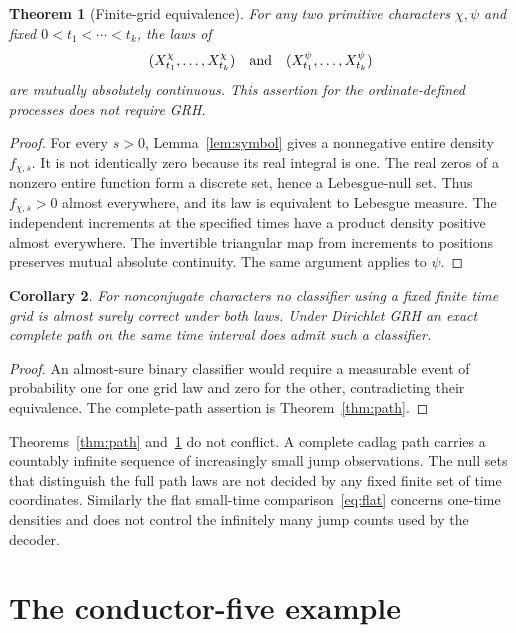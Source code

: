 \documentclass[11pt]{article}
\newtheorem{theorem}{Theorem}[section]
\newtheorem{corollary}[theorem]{Corollary}
\theoremstyle{definition}
\begin{document}
\begin{theorem}[Finite-grid equivalence]\label{thm:grid}
For any two primitive characters $\chi,\psi$ and fixed
$0<t_1<\cdots<t_k$, the laws of
\[
 (X^\chi_{t_1},\ldots,X^\chi_{t_k})
 \quad\hbox{and}\quad
 (X^\psi_{t_1},\ldots,X^\psi_{t_k})
\]
are mutually absolutely continuous. This assertion for the ordinate-defined
processes does not require GRH.
\end{theorem}

\begin{proof}
For every $s>0$, Lemma~\ref{lem:symbol} gives a nonnegative entire density
$f_{\chi,s}$. It is not identically zero because its real integral is one.
The real zeros of a nonzero entire function form a discrete set, hence a
Lebesgue-null set. Thus $f_{\chi,s}>0$ almost everywhere, and its law is
equivalent to Lebesgue measure. The independent increments at the specified
times have a product density positive almost everywhere. The invertible
triangular map from increments to positions preserves mutual absolute
continuity. The same argument applies to $\psi$.
\end{proof}

\begin{corollary}
For nonconjugate characters no classifier using a fixed finite time grid is
almost surely correct under both laws. Under Dirichlet GRH an exact complete
path on the same time interval does admit such a classifier.
\end{corollary}

\begin{proof}
An almost-sure binary classifier would require a measurable event of
probability one for one grid law and zero for the other, contradicting their
equivalence. The complete-path assertion is Theorem~\ref{thm:path}.
\end{proof}

Theorems~\ref{thm:path} and~\ref{thm:grid} do not conflict. A complete cadlag
path carries a countably infinite sequence of increasingly small jump
observations. The null sets that distinguish the full path laws are not
decided by any fixed finite set of time coordinates. Similarly the flat
small-time comparison~\eqref{eq:flat} concerns one-time densities and does
not control the infinitely many jump counts used by the decoder.

\section{The conductor-five example}
\label{sec:five}
\end{document}
